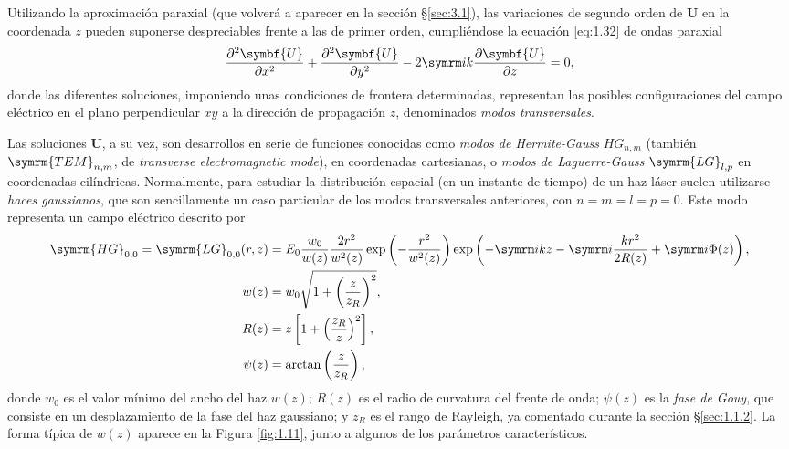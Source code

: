 Utilizando la aproximación paraxial (que volverá a aparecer en la sección \S\ref{sec:3.1}), las variaciones de segundo orden de $\symbf{U}$ en la coordenada $z$ pueden suponerse despreciables frente a las de primer orden, cumpliéndose la ecuación \eqref{eq:1.32} de ondas paraxial
\begin{equation}\label{eq:1.32}
  \pdvN{\symbf{U}}{x}{2} + \pdvN{\symbf{U}}{y}{2} - 2 \iu k \pdv{\symbf{U}}{z} = 0,
\end{equation}
donde las diferentes soluciones, imponiendo unas condiciones de frontera determinadas, representan las posibles configuraciones del campo eléctrico en el plano perpendicular $xy$ a la dirección de propagación $z$, denominados \emph{modos transversales}.

Las soluciones $\symbf{U}$, a su vez, son desarrollos en serie de funciones conocidas como \emph{modos de Hermite-Gauss} $HG_{n,m}$ (también $\symrm{TEM}_{n,m}$, de \emph{transverse electromagnetic mode}), en coordenadas cartesianas, o \emph{modos de Laguerre-Gauss} $\symrm{LG}_{l,p}$ en coordenadas cilíndricas. Normalmente, para estudiar la distribución espacial (en un instante de tiempo) de un haz láser suelen utilizarse \emph{haces gaussianos}, que son sencillamente un caso particular de los modos transversales anteriores, con $n=m=l=p=0$. Este modo representa un campo eléctrico descrito por \autocite{Milonni1988}
\begin{align}
  \label{eq:1.33}
  \symrm{HG}_{0,0}=\symrm{LG}_{0,0}(r,z) &= E_{0}\frac{w_{0}}{w(z)}\frac{2r^{2}}{w^{2}(z)}\exp \left(-\frac{r^{2}}{w^{2}(z)}\right)\exp \left(-\iu kz - \iu \frac{kr^{2}}{2R(z)} + \iu \Phi(z)\right), \\
  \label{eq:1.34}
  w(z) &= w_{0}\sqrt{1+\left(\frac{z}{z_{R}}\right)^{2}}, \\
  \label{eq:1.35}
  R(z) &= z \left[1+\left(\frac{z_{R}}{z}\right)^{2}\right], \\
  \label{eq:1.36}
  \psi(z) &= \arctan\left(\frac{z}{z_{R}}\right),
\end{align}
donde $w_{0}$ es el valor mínimo del ancho del haz $w(z)$; $R(z)$ es el radio de curvatura del frente de onda; $\psi(z)$ es la \emph{fase de Gouy}, que consiste en un desplazamiento de la fase del haz gaussiano; y $z_{R}$ es el rango de Rayleigh, ya comentado durante la sección \S\ref{sec:1.1.2}. La forma típica de $w(z)$ aparece en la Figura \ref{fig:1.11}, junto a algunos de los parámetros característicos.

